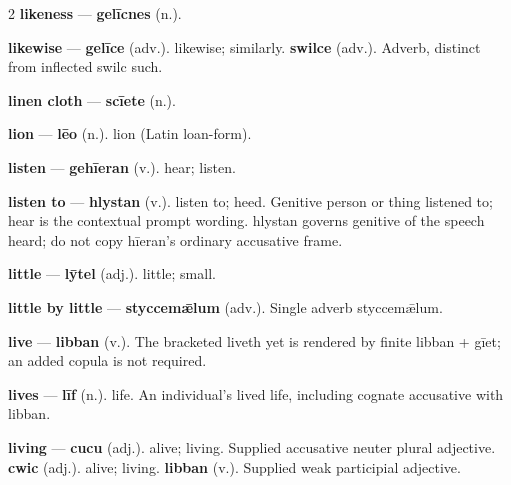 \begin{multicols}{2}
\textbf{likeness} — \textbf{gelīcnes} (n.).\par
\textbf{likewise} — \textbf{gelīce} (adv.). likewise; similarly. \textbf{swilce} (adv.). Adverb, distinct from inflected swilc such.\par
\textbf{linen cloth} — \textbf{scīete} (n.).\par
\textbf{lion} — \textbf{lēo} (n.). lion (Latin loan-form).\par
\textbf{listen} — \textbf{gehīeran} (v.). hear; listen.\par
\textbf{listen to} — \textbf{hlystan} (v.). listen to; heed. Genitive person or thing listened to; hear is the contextual prompt wording. hlystan governs genitive of the speech heard; do not copy hīeran's ordinary accusative frame.\par
\textbf{little} — \textbf{lȳtel} (adj.). little; small.\par
\textbf{little by little} — \textbf{styccemǣlum} (adv.). Single adverb styccemǣlum.\par
\textbf{live} — \textbf{libban} (v.). The bracketed liveth yet is rendered by finite libban + gīet; an added copula is not required.\par
\textbf{lives} — \textbf{līf} (n.). life. An individual's lived life, including cognate accusative with libban.\par
\textbf{living} — \textbf{cucu} (adj.). alive; living. Supplied accusative neuter plural adjective. \textbf{cwic} (adj.). alive; living. \textbf{libban} (v.). Supplied weak participial adjective.\par

\end{multicols}
